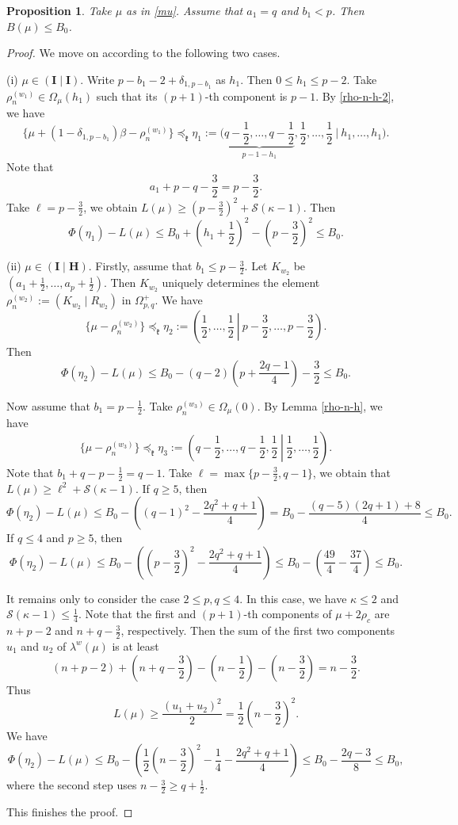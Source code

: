 \documentclass[11pt]{amsart}
\theoremstyle{plain}
\newtheorem{prop}[thm]{Proposition}
\theoremstyle{definition}
\newcommand{\mfk}{\mathfrak{k}}
\newcommand{\caS}{\mathcal{S}}
\begin{document}
\begin{prop}\label{pro-3}
	Take $\mu$ as in \eqref{mu}. Assume that $a_1=q$ and $b_1<p$. Then $B(\mu)\le B_0$.
\end{prop}
\begin{proof}
 We move on according to the following two cases.
	
	(i) $\mu\in (\textbf{I}\mid \textbf{I})$.
	Write $p-b_1-2+\delta_{1,p-b_1}$ as $h_1$. Then $0\le h_1\le p-2$. Take $\rho_n^{(w_1)}\in \Omega_{\mu}(h_1)$ such that its $(p+1)$-th component is $p-1$. By \eqref{rho-n-h-2}, we have
		\[\{\mu+(1-\delta_{1,p-b_1})\beta-\rho_n^{(w_1)}\}\preceq_\mfk \eta_1:=\bigg(\underbrace{q-\frac{1}{2},\dots,q-\frac{1}{2}}_{p-1-h_1},\frac{1}{2},\dots,\frac{1}{2}\ \bigg|\ h_1,\dots,h_1\bigg).\]
			Note that
		\[a_1+p-q-\frac{3}{2}=p-\frac{3}{2}.\]	
		Take $\ell=p-\frac{3}{2}$, we obtain $L(\mu)\ge \left(p-\frac{3}{2}\right)^2+\caS(\kappa-1)$.	Then
		\[\Phi(\eta_1)-L(\mu)\le B_0+\left(h_1+\frac{1}{2}\right)^2-\left(p-\frac{3}{2}\right)^2\le B_0.\]
		
	(ii) $\mu\in (\textbf{I}\mid \textbf{H})$. Firstly, assume that $b_1\le p-\frac{3}{2}$. Let $K_{w_2}$ be $(a_1+\frac{1}{2},\dots,a_p+\frac{1}{2})$. Then $K_{w_2}$ uniquely determines the element $\rho_n^{(w_2)}:=(K_{w_2}\mid R_{w_2})$ in $\Omega_{p,q}^+$. We have
		\[\{\mu-\rho_n^{(w_2)}\}\preceq_\mfk \eta_2:=\left(\frac{1}{2},\dots,\frac{1}{2}\ \left|\  p-\frac{3}{2},\dots, p-\frac{3}{2}\right)\right..\]
	Then
	\[\Phi(\eta_2)-L(\mu)\le  B_0-(q-2)\left(p+\frac{2q-1}{4}\right)-\frac{3}{2}\le B_0.\]
		
	Now assume that $b_1=p-\frac{1}{2}$. Take $\rho_n^{(w_3)}\in \Omega_{\mu}(0)$. By Lemma \ref{rho-n-h}, we have
		\[\{\mu-\rho_n^{(w_3)}\}\preceq_\mfk \eta_3 :=\left.\left(q-\frac{1}{2},\dots,q-\frac{1}{2},\frac{1}{2}\ \right|\ \frac{1}{2},\dots,\frac{1}{2}\right).\]
	Note that $b_1+q-p-\frac{1}{2}=q-1$. Take $\ell=\max\{p-\frac{3}{2},q-1\}$, we obtain that $L(\mu)\ge \ell^2+\caS(\kappa-1)$.  If $q\ge 5$, then
		\[\Phi(\eta_2)-L(\mu)\le B_0-\left((q-1)^2-\frac{2q^2+q+1}{4}\right)=B_0-\frac{(q-5)(2q+1)+8}{4}\le B_0.\]
	 If $q\le 4$ and $p\ge 5$, then
	 \[\Phi(\eta_2)-L(\mu)\le B_0-\left(\left(p-\frac{3}{2}\right)^2-\frac{2q^2+q+1}{4}\right)\le B_0-\left(\frac{49}{4}-\frac{37}{4}\right)\le B_0.\]
	
	 It remains only to consider the case $2\le p,q\le 4$. In this case, we have $\kappa\le 2$ and $\caS(\kappa-1)\le\frac{1}{4}$. Note that the first and $(p+1)$-th components of $\mu+2\rho_c$ are $n+p-2$ and $n+q-\frac{3}{2}$, respectively. Then the sum of the first two components $u_1$ and $u_2$ of $\lambda^w(\mu)$ is at least
		\[(n+p-2)+\left(n+q-\frac{3}{2}\right)-\left(n-\frac{1}{2}\right)-\left(n-\frac{3}{2}\right)=n-\frac{3}{2}.\]
	Thus
		\[L(\mu)\ge \frac{(u_1+u_2)^2}{2}=\frac{1}{2}\left(n-\frac{3}{2}\right)^2.\]
	We have
	\[\Phi(\eta_2)-L(\mu)\le B_0-\left(\frac{1}{2}\left(n-\frac{3}{2}\right)^2-\frac{1}{4}-\frac{2q^2+q+1}{4}\right)\le B_0-\frac{2q-3}{8}\le B_0,\]
	where the second step uses $n-\frac{3}{2}\ge q+\frac{1}{2}$.
	
This finishes the proof.
\end{proof}
\end{document}
